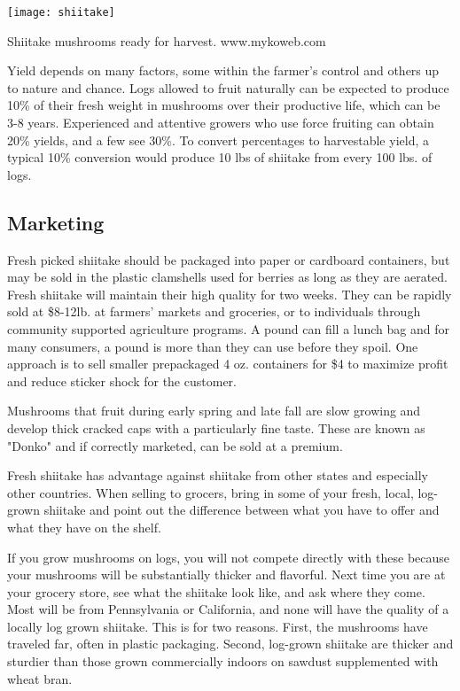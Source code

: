 \documentclass{tufte-handout}
\begin{document}
\begin{marginfigure}
\texttt{[image: shiitake]}
\caption{Shiitake mushrooms ready for harvest. www.mykoweb.com}
\end{marginfigure}


Yield depends on many factors, some within the farmer’s control and others up to nature and chance. 
Logs allowed to fruit naturally can be expected to produce 10\% of their fresh weight in mushrooms over their productive life, which can be 3-8 years. 
Experienced and attentive growers who use force fruiting can obtain 20\% yields, and a few see 30\%. 
To convert percentages to harvestable yield, a typical 10\% conversion would produce 10 lbs of shiitake from every 100 lbs. of logs.

\subsection{Marketing}

Fresh picked shiitake should be packaged into paper or cardboard containers, but may be sold in the plastic clamshells used for berries as long as they are aerated. 
Fresh shiitake will maintain their high quality for two weeks. 
They can be rapidly sold at \$8-12\/lb. at farmers' markets and groceries, or to individuals through community supported agriculture programs. 
A pound can fill a lunch bag and for many consumers, a pound is more than they can use before they spoil. 
One approach is to sell smaller prepackaged 4 oz. containers for \$4 to maximize profit and reduce sticker shock for the customer.

Mushrooms that fruit during early spring and late fall are slow growing and develop thick cracked caps with a particularly fine taste. 
These are known as "Donko" and if correctly marketed, can be sold at a premium. 

Fresh shiitake has advantage against shiitake from other states and especially other countries. When selling to grocers, bring in some of your fresh, local, log-grown shiitake and point out the difference between what you have to offer and what they have on the shelf. 


If you grow mushrooms on logs, you will not compete directly with these because your mushrooms will be substantially thicker and flavorful.
Next time you are at your grocery store, see what the shiitake look like, and ask where they come. 
Most will be from Pennsylvania or California, and none will have the quality of a locally log grown shiitake. 
This is for two reasons. 
First, the mushrooms have traveled far, often in plastic packaging. 
Second, log-grown shiitake are thicker and sturdier than those grown commercially indoors on sawdust supplemented with wheat bran.
\end{document}
